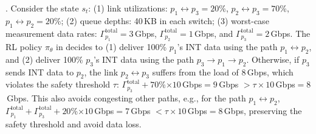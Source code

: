 . Consider the state $s_t$: (1) link utilizations: $p_1\leftrightarrow p_3=20$\%, $p_2\leftrightarrow p_3=70$\%, $p_1\leftrightarrow p_2=20$\%; (2) queue depths: 40\,KB in each switch; (3) worst-case measurement data rates: $\Gamma_{p_1}^{\text{total}}=3$\,Gbps, $\Gamma_{p_2}^{\text{total}}=1$\,Gbps, and $\Gamma_{p_3}^{\text{total}}=2$\,Gbps. The RL policy $\pi_{\theta}$ in \sysname decides to (1) deliver 100\% $p_1$'s INT data using the path $p_1\leftrightarrow p_2$, and (2) deliver 100\% $p_3$'s INT data using the path $p_3\rightarrow p_1\rightarrow p_2$. Otherwise, if $p_3$ sends INT data to $p_2$, the link $p_2\leftrightarrow p_3$ suffers from the load of 8\,Gbps, which violates the safety threshold $\tau$: $\Gamma_{p_3}^{\text{total}}+70$\%$\times 10$\,Gbps$=9$\,Gbps $> \tau\times 10$\,Gbps$=8$\,Gbps. This also avoids congesting other paths, e.g., for the path $p_1 \leftrightarrow p_2$, $\Gamma_{p_1}^{\text{total}}+\Gamma_{p_3}^{\text{total}}+20$\%$\times 10$\,Gbps$=7$\,Gbps $< \tau\times 10$\,Gbps$=8$\,Gbps, preserving the safety threshold and avoid data loss. 












